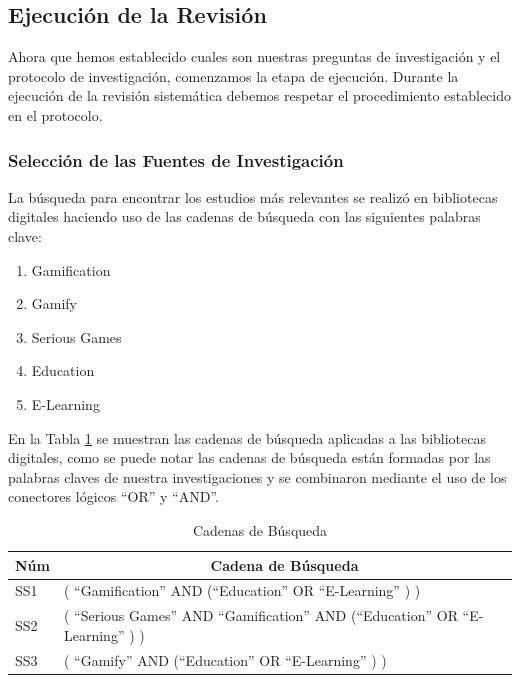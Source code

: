 \documentclass{report}
\begin{document}
        \subsection{Ejecución de la Revisión}
    
        Ahora que hemos establecido cuales son nuestras preguntas de investigación y el protocolo de investigación, comenzamos la etapa de ejecución. Durante la ejecución de la revisión sistemática debemos respetar el procedimiento establecido en el protocolo.
    
            \subsubsection{Selección de las Fuentes de  Investigación}
    
            La búsqueda para encontrar los estudios más relevantes se realizó en bibliotecas digitales haciendo uso de las cadenas de búsqueda con las siguientes palabras clave:
            \begin{enumerate}
                \item Gamification
                \item Gamify
                \item Serious Games
                \item Education
                \item E-Learning
            \end{enumerate}       
            En la Tabla \ref{table:SearchString} se muestran las cadenas de búsqueda aplicadas a las bibliotecas digitales, como se puede notar las cadenas de búsqueda están formadas por las palabras claves de nuestra investigaciones y se combinaron mediante el uso de los conectores lógicos ``OR''{ }y ``AND''.    
            \begin{table}
                \begin{center}
                    \caption{Cadenas de Búsqueda}
                    \label{table:SearchString}
                    \begin{tabular}{| p{1.5cm} | p{12.5cm} |}
                        \toprule
                        \hline
                        \multicolumn{1}{|c|}{\textbf{Núm}} & \multicolumn{1}{|c|}{\textbf{Cadena de Búsqueda}} \\
                        \hline
                        SS1 & ( ``Gamification''{ }AND (``Education''{ }OR ``E-Learning''{ }) )\\
                        \hline
                        SS2 & ( ``Serious Games''{ }AND ``Gamification''{ }AND (``Education''{ }OR ``E-Learning''{ }) )\\
                        \hline            
                        SS3 & ( ``Gamify''{ }AND (``Education''{ }OR ``E-Learning''{ }) )\\
                        \hline
                    \end{tabular}
                \end{center}
            \end{table}
            
\end{document}
